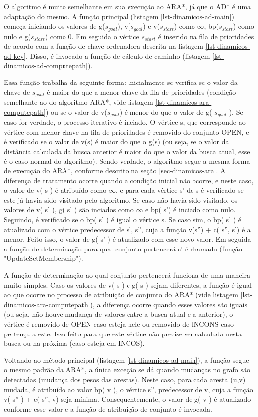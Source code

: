 O algoritmo é muito semelhante em sua execução ao ARA*, já que o AD* é uma adaptação do mesmo. A função principal (listagem \ref{lst-dinamicos-ad-main}) começa iniciando os valores de g($s_{goal}$), v($s_{goal}$) e v($s_{start}$) como $\infty$, bp($s_{start}$) como nulo e g($s_{start}$) como 0. Em seguida o vértice $s_{start}$ é inserido na fila de prioridades de acordo com  a função de chave ordenadora descrita na listagem \ref{lst-dinamicos-ad-key}. Disso, é invocado a função de cálculo de caminho (listagem \ref{lst-dinamicos-ad-computepath}).

Essa função trabalha da seguinte forma: inicialmente se verifica se o valor da chave de $s_{goal}$ é maior do que a menor chave da fila de prioridades (condição semelhante ao do algoritmo ARA*, vide listagem \ref{lst-dinamicos-ara-computepath}) ou se o valor de v($s_{goal}$) é menor do que o valor de g( $s_{goal}$ ). Se caso for verdade, o processo iterativo é inciado. O vértice s, que corresponde ao vértice com menor chave na fila de prioridades é removido do conjunto OPEN, e é verificado se o valor de v(s) é maior do que o g(s) (ou seja, se o valor da distância calculada da busca anterior é maior do que o valor da busca atual, esse é o caso normal do algoritmo). Sendo verdade, o algoritmo segue a mesma forma de execução do ARA*, conforme descrito na seção \ref{sec-dinamicos-ara}. A diferença de tratamento ocorre quando a condição inicial não ocorre, e neste caso, o valor de v( s ) é atribuído como $\infty$, e para cada vértice s' de s é verificado se este já havia sido visitado pelo algoritmo. Se caso não havia sido visitado, os valores de v( s' ), g( s' ) são inciados como $\infty$ e bp( s') é inciado como nulo. Seguindo, é verificado se o bp( s' ) é igual o vértice s. Se caso sim, o bp( s' ) é atualizado com o vértice predecessor de s', s'', cuja a função v(s'') + c( s'', s') é a menor. Feito isso, o valor de g( s' ) é atualizado com esse novo valor. Em seguida a função de determinação para qual conjunto pertencerá s' é chamado (função "UpdateSetMembership").

A função de determinação ao qual conjunto pertencerá funciona de uma maneira muito simples. Caso os valores de v( s ) e g( s ) sejam diferentes, a função é igual ao que ocorre no processo de atribuição de conjunto do ARA* (vide listagem \ref{lst-dinamicos-ara-computepath}), a diferença ocorre quando esses valores são iguais (ou seja, não houve mudança de valores entre a busca atual e a anterior), o vértice é removido de OPEN caso esteja nele ou removido de INCONS caso pertença a este. Isso feito para que este vértice não precise ser calculada nesta busca ou na próxima (caso esteja em INCOS).

Voltando ao método principal (listagem \ref{lst-dinamicos-ad-main}), a função segue o mesmo padrão da ARA*, a única exceção se dá quando mudanças no grafo são detectadas (mudança dos pesos das arestas). Neste caso, para cada aresta (u,v) mudada, é atribuído ao valor bp( v ), o vértice s'', predecessor de v, cuja a função v( s'' ) + c( s'', v) seja mínima. Consequentemente, o valor de g( v ) é atualizado conforme esse valor e a função de atribuição de conjunto é invocada. 
